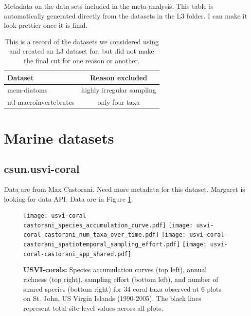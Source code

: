 \documentclass[11pt, oneside]{article}
\begin{document}
\begin{table}[h!]
\scriptsize
   \centering
     \caption{Metadata on the data sets included in the meta-analysis. This table is automatically generated directly from the datasets in the L3 folder. I can make it look prettier once it is final.} 

   \label{metadata} 
\end{table}


\begin{table}[h!]
\scriptsize
   \centering
     \caption{This is a record of the datasets we considered using and created an L3 dataset for, but did not make the final cut for one reason or another.} 
   \begin{tabular}{lc} 
\\
\hline 
\hline
Dataset &Reason excluded\\
\hline
mcm-diatoms & highly irregular sampling\\
ntl-macroinvertebrates & only four taxa\\
   \end{tabular}

   \label{not_used} 
\end{table}


\section {Marine datasets}


\subsection {csun.usvi-coral}
Data are from Max Castorani.
Need more metadata for this dataset.
Margaret is looking for data API.
Data are in Figure \ref{usvi-coral}.

\begin{figure}[h!]
\centering
\texttt{[image: usvi-coral-castorani\_species\_accumulation\_curve.pdf]}
\texttt{[image: usvi-coral-castorani\_num\_taxa\_over\_time.pdf]}
\texttt{[image: usvi-coral-castorani\_spatiotemporal\_sampling\_effort.pdf]}
\texttt{[image: usvi-coral-castorani\_spp\_shared.pdf]}
\caption{{\bf USVI-corals:} Species accumulation curves (top left),  annual richness (top right), sampling effort (bottom left), and number of shared species (bottom right)  for 34 coral taxa observed at 6 plots on St. John, US Virgin Islands (1990-2005). The black lines represent total site-level values across all plots.}
\label{usvi-coral}
\end{figure}
\end{document}
